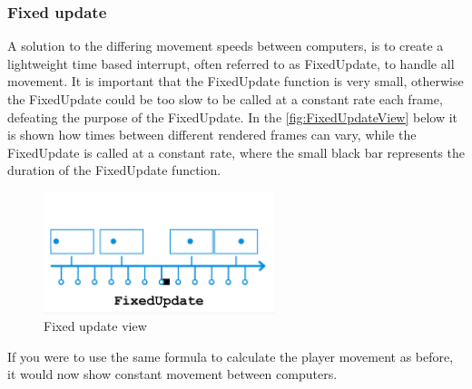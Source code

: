 \documentclass{article} %
\begin{document}
\subsubsection{Fixed update}
A solution to the differing movement speeds between computers, is to create a lightweight time based interrupt, often referred to as FixedUpdate, to handle all movement.
It is important that the FixedUpdate function is very small, otherwise the FixedUpdate could be too slow to be called at a constant rate each frame, defeating the purpose of the FixedUpdate.
In the \autoref{fig:FixedUpdateView} below it is shown how times between different rendered frames can vary, while the FixedUpdate is called at a constant rate, where the small black bar represents the duration of the FixedUpdate function.
\begin{figure}[h!]
    \centering
    \includegraphics[width=0.6\textwidth]{fixed_update_explanation.png}
    \caption{Fixed update view}
    \label{fig:FixedUpdateView}
\end{figure}
\newline
If you were to use the same formula to calculate the player movement as before, it would now show constant movement between computers.
\end{document}
